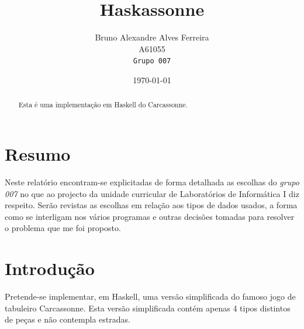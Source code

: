 \documentclass[11pt, a4paper, twoside]{article}
\begin{document}
\title{Haskassonne}
\date{\today}
\author{
  Bruno Alexandre Alves Ferreira\\
  {\small A61055}\\
  \texttt{Grupo 007}
}

\maketitle
\begin{abstract}
\begin{center}
  Esta é uma implementação em Haskell do Carcassonne.
\end{center}
\end{abstract}
\newpage

\tableofcontents

\newpage
\section{Resumo}

Neste relatório encontram-se explicitadas de forma detalhada as escolhas do \textit{grupo 007} no que ao projecto da unidade curricular de Laboratórios de Informática I diz respeito. Serão revistas as escolhas em relação aos tipos de dados usados, a forma como se interligam nos vários programas e outras decisões tomadas para resolver o problema que me foi proposto.

\newpage
\section{Introdução}

Pretende-se implementar, em Haskell, uma versão simplificada do famoso jogo de tabuleiro Carcassonne. Esta versão simplificada contém apenas 4 tipos distintos de peças e não contempla estradas.
\end{document}
